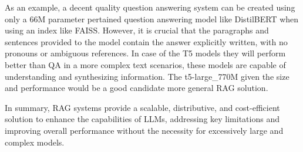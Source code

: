 \documentclass{wseas}
\begin{document}
As an example, a decent quality question answering system can be created
using only a 66M parameter pertained question answering model like
DistilBERT when using an index like FAISS. However, it is crucial that
the paragraphs and sentences provided to the model contain the answer
explicitly written, with no pronouns or ambiguous references. In case of
the T5 models they will perform better than QA in a more complex text
scenarios, these models are capable of understanding and synthesizing
information. The t5-large\_770M given the size and performance would be
a good candidate more general RAG solution.

In summary, RAG systems provide a scalable, distributive, and
cost-efficient solution to enhance the capabilities of LLMs, addressing
key limitations and improving overall performance without the necessity
for excessively large and complex models.
\end{document}
